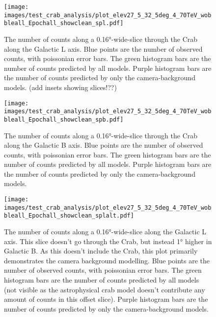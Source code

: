     \begin{figure}[h]
      \centering
      \texttt{[image: images/test\_crab\_analysis/plot\_elev27\_5\_32\_5deg\_4\_70TeV\_wobbleall\_Epochall\_showclean\_spl.pdf]}
      \caption[Crab Profile along Galactic L]
      {
        The number of counts along a \ang{0.16}-wide-slice through the Crab along the Galactic L axis.
        Blue points are the number of observed counts, with poissonian error bars.
        The green histogram bars are the number of counts predicted by all models.
        Purple histogram bars are the number of counts predicted by only the camera-background models.
        {\color{red}(add insets showing slices!??)}
      }
      \label{fig:crab_profile_l}
    \end{figure}

    \begin{figure}[h]
      \centering
      \texttt{[image: images/test\_crab\_analysis/plot\_elev27\_5\_32\_5deg\_4\_70TeV\_wobbleall\_Epochall\_showclean\_spb.pdf]}
      \caption[Crab Profile along Galactic B]
      {
        The number of counts along a \ang{0.16}-wide-slice through the Crab along the Galactic B axis.
        Blue points are the number of observed counts, with poissonian error bars.
        The green histogram bars are the number of counts predicted by all models.
        Purple histogram bars are the number of counts predicted by only the camera-background models.
      }
      \label{fig:crab_profile_b}
    \end{figure}
    
    \begin{figure}[h]
      \centering
      \texttt{[image: images/test\_crab\_analysis/plot\_elev27\_5\_32\_5deg\_4\_70TeV\_wobbleall\_Epochall\_showclean\_splalt.pdf]}
      \caption[Crab Profile along Galactic L Off Source]
      {
        The number of counts along a \ang{0.16}-wide-slice along the Galactic L axis.
        This slice doesn't go through the Crab, but instead \ang{1} higher in Galactic B.
        As this doesn't include the Crab, this plot primarily demonstrates the camera background modelling.
        Blue points are the number of observed counts, with poissonian error bars.
        The green histogram bars are the number of counts predicted by all models (not visible as the astrophysical crab model doesn't contribute any amount of counts in this offset slice).
        Purple histogram bars are the number of counts predicted by only the camera-background models.
      }
      \label{fig:crab_profile_l_off}
    \end{figure}


